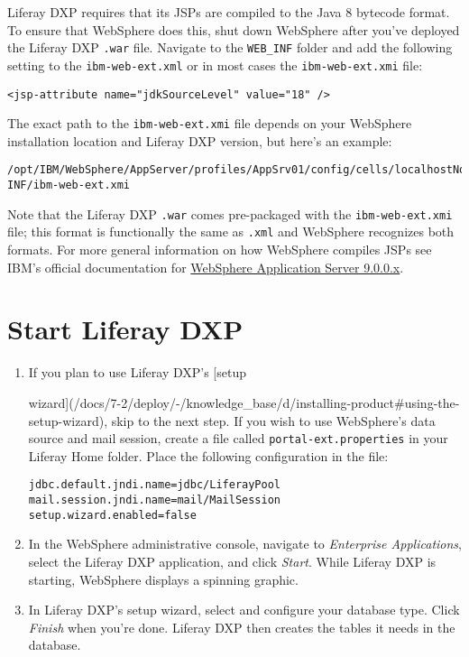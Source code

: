 Liferay DXP requires that its JSPs are compiled to the Java 8 bytecode
format. To ensure that WebSphere does this, shut down WebSphere after
you've deployed the Liferay DXP \texttt{.war} file. Navigate to the
\texttt{WEB\_INF} folder and add the following setting to the
\texttt{ibm-web-ext.xml} or in most cases the \texttt{ibm-web-ext.xmi}
file:

\begin{verbatim}
<jsp-attribute name="jdkSourceLevel" value="18" />
\end{verbatim}

The exact path to the \texttt{ibm-web-ext.xmi} file depends on your
WebSphere installation location and Liferay DXP version, but here's an
example:

\begin{verbatim}
/opt/IBM/WebSphere/AppServer/profiles/AppSrv01/config/cells/localhostNode01Cell/applications/liferayXX.ear/deployments/liferayXX/liferayXX.war/WEB-INF/ibm-web-ext.xmi
\end{verbatim}

Note that the Liferay DXP \texttt{.war} comes pre-packaged with the
\texttt{ibm-web-ext.xmi} file; this format is functionally the same as
\texttt{.xml} and WebSphere recognizes both formats. For more general
information on how WebSphere compiles JSPs see IBM's official
documentation for
\href{https://www.ibm.com/support/knowledgecenter/en/SSEQTP_9.0.0/com.ibm.websphere.base.doc/ae/rweb_jspengine.html}{WebSphere
Application Server 9.0.0.x}.

\section{Start Liferay DXP}\label{start-liferay-dxp}

\begin{enumerate}
\def\labelenumi{\arabic{enumi}.}
\item
  If you plan to use Liferay DXP's {[}setup

  wizard{]}(/docs/7-2/deploy/-/knowledge\_base/d/installing-product\#using-the-setup-wizard),
  skip to the next step. If you wish to use WebSphere's data source and
  mail session, create a file called \texttt{portal-ext.properties} in
  your Liferay Home folder. Place the following configuration in the
  file:

\begin{verbatim}
jdbc.default.jndi.name=jdbc/LiferayPool
mail.session.jndi.name=mail/MailSession
setup.wizard.enabled=false
\end{verbatim}
\item
  In the WebSphere administrative console, navigate to \emph{Enterprise
  Applications}, select the Liferay DXP application, and click
  \emph{Start}. While Liferay DXP is starting, WebSphere displays a
  spinning graphic.
\item
  In Liferay DXP's setup wizard, select and configure your database
  type. Click \emph{Finish} when you're done. Liferay DXP then creates
  the tables it needs in the database.
\end{enumerate}

